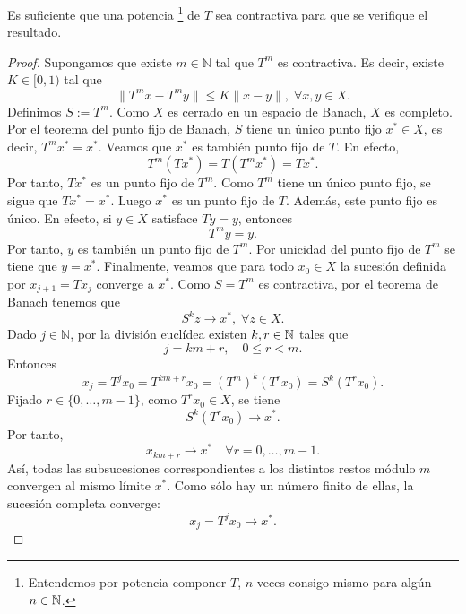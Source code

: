 \begin{colorary}
Es suficiente que una potencia \footnote{Entendemos por potencia componer $\displaystyle T $, $\displaystyle n $ veces consigo mismo para algún $\displaystyle n\in \mathbb{N} $.} de $\displaystyle T $ sea contractiva para que se verifique el resultado.
\end{colorary}
\begin{proof}
Supongamos que existe $m \in \mathbb{N}$ tal que $T^m$ es contractiva. Es decir, existe
$K \in [0,1)$ tal que
\[\|T^m x - T^m y\| \leq K \|x-y\|,\; \forall x,y \in X.\]
Definimos $\displaystyle S := T^m $. Como $X$ es cerrado en un espacio de Banach, $X$ es completo. Por el teorema del punto fijo de Banach, $S$ tiene un único punto fijo $x^\ast \in X$, es decir, $\displaystyle T^m x^\ast = x^\ast $.
Veamos que $x^\ast$ es también punto fijo de $T$. En efecto,
\[T^m(Tx^\ast)=T(T^m x^\ast)=Tx^\ast.\]
Por tanto, $Tx^\ast$ es un punto fijo de $T^m$. Como $T^m$ tiene un único punto fijo, se sigue que $\displaystyle Tx^\ast = x^\ast $. 
Luego $x^\ast$ es un punto fijo de $T$.
Además, este punto fijo es único. En efecto, si $y \in X$ satisface $\displaystyle Ty = y$, entonces
\[T^m y=y.\]
Por tanto, $y$ es también un punto fijo de $T^m$. Por unicidad del punto fijo de $T^m$ se tiene que $\displaystyle y=x^\ast $. 
Finalmente, veamos que para todo $x_0 \in X$ la sucesión definida por $\displaystyle x_{j+1}=Tx_j $
converge a $x^\ast$. Como $S=T^m$ es contractiva, por el teorema de Banach tenemos que
\[S^k z \longrightarrow x^\ast, \; \forall z \in X.\]
Dado $j \in \mathbb{N}$, por la división euclídea existen $\displaystyle k,r \in \mathbb{N} $ tales que
\[j=km+r,\quad 0 \leq r < m.\]
Entonces
\[x_j=T^j x_0=T^{km+r}x_0=(T^m)^k(T^r x_0)=S^k(T^r x_0).\]
Fijado $r \in \{0,\dots,m-1\}$, como $T^r x_0 \in X$, se tiene
\[S^k(T^r x_0)\longrightarrow x^\ast.\]
Por tanto,
\[x_{km+r}\longrightarrow x^\ast\quad\forall r=0,\dots,m-1.\]
Así, todas las subsucesiones correspondientes a los distintos restos módulo $m$
convergen al mismo límite $x^\ast$. Como sólo hay un número finito de ellas,
la sucesión completa converge:
\[
x_j=T^j x_0 \longrightarrow x^\ast.
\]
\end{proof}
